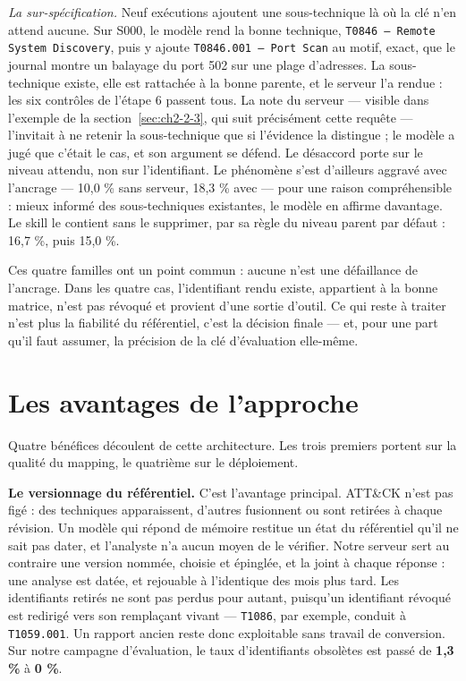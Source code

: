 \emph{La sur-spécification.} Neuf exécutions ajoutent une sous-technique là où la clé n'en attend aucune. Sur S000, le modèle rend la bonne technique, \texttt{T0846 --- Remote System Discovery}, puis y ajoute \texttt{T0846.001 --- Port Scan} au motif, exact, que le journal montre un balayage du port 502 sur une plage d'adresses. La sous-technique existe, elle est rattachée à la bonne parente, et le serveur l'a rendue : les six contrôles de l'étape 6 passent tous. La note du serveur --- visible dans l'exemple de la section~\ref{sec:ch2-2-3}, qui suit précisément cette requête --- l'invitait à ne retenir la sous-technique que si l'évidence la distingue ; le modèle a jugé que c'était le cas, et son argument se défend. Le désaccord porte sur le niveau attendu, non sur l'identifiant. Le phénomène s'est d'ailleurs aggravé avec l'ancrage --- 10,0 \% sans serveur, 18,3 \% avec --- pour une raison compréhensible : mieux informé des sous-techniques existantes, le modèle en affirme davantage. Le skill le contient sans le supprimer, par sa règle du niveau parent par défaut : 16,7 \%, puis 15,0 \%.

Ces quatre familles ont un point commun : aucune n'est une défaillance de l'ancrage. Dans les quatre cas, l'identifiant rendu existe, appartient à la bonne matrice, n'est pas révoqué et provient d'une sortie d'outil. Ce qui reste à traiter n'est plus la fiabilité du référentiel, c'est la décision finale --- et, pour une part qu'il faut assumer, la précision de la clé d'évaluation elle-même.

\section{Les avantages de l'approche}\label{sec:ch2-4}

Quatre bénéfices découlent de cette architecture. Les trois premiers portent sur la qualité du mapping, le quatrième sur le déploiement.

\textbf{Le versionnage du référentiel.} C'est l'avantage principal. ATT\&CK n'est pas figé : des techniques apparaissent, d'autres fusionnent ou sont retirées à chaque révision. Un modèle qui répond de mémoire restitue un état du référentiel qu'il ne sait pas dater, et l'analyste n'a aucun moyen de le vérifier. Notre serveur sert au contraire une version nommée, choisie et épinglée, et la joint à chaque réponse : une analyse est datée, et rejouable à l'identique des mois plus tard. Les identifiants retirés ne sont pas perdus pour autant, puisqu'un identifiant révoqué est redirigé vers son remplaçant vivant --- \texttt{T1086}, par exemple, conduit à \texttt{T1059.001}. Un rapport ancien reste donc exploitable sans travail de conversion. Sur notre campagne d'évaluation, le taux d'identifiants obsolètes est passé de \textbf{1,3 \%} à \textbf{0 \%}.


